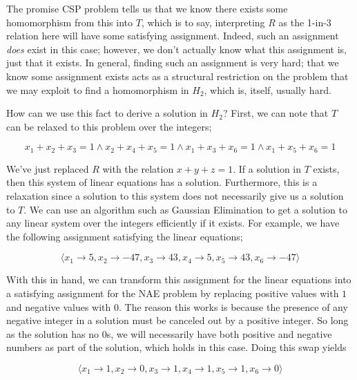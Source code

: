 The promise CSP problem tells us that we know there exists some homomorphism from this into $T$, which is to say, interpreting $R$ as the 1-in-3 relation here will have some satisfying assignment. Indeed, such an assignment \textit{does} exist in this case; however, we don't actually know what this assignment is, just that it exists. In general, finding such an assignment is very hard; that we know some assignment exists acts as a structural restriction on the problem that we may exploit to find a homomorphism in $H_2$, which is, itself, usually hard.

How can we use this fact to derive a solution in $H_2$? First, we can note that $T$ can be relaxed to this problem over the integers;

\begin{equation}
    x_1 + x_2 + x_3 = 1 \wedge x_2 + x_4 + x_5 = 1 \wedge x_1 + x_3 + x_6 = 1 \wedge x_1 + x_5 + x_6 = 1
\end{equation}

We've just replaced $R$ with the relation $x + y + z = 1$. If a solution in $T$ exists, then this system of linear equations has a solution. Furthermore, this is a relaxation since a solution to this system does not necessarily give us a solution to $T$. We can use an algorithm such as Gaussian Elimination to get a solution to any linear system over the integers efficiently if it exists. For example, we have the following assignment satisfying the linear equations;

\begin{equation}
    \langle x_1 \rightarrow 5, x_2 \rightarrow -47, x_3 \rightarrow 43, x_4 \rightarrow 5, x_5 \rightarrow 43, x_6 \rightarrow -47 \rangle
\end{equation}

With this in hand, we can transform this assignment for the linear equations into a satisfying assignment for the NAE problem by replacing positive values with $1$ and negative values with $0$. The reason this works is because the presence of any negative integer in a solution must be canceled out by a positive integer. So long as the solution has no 0s, we will necessarily have both positive and negative numbers as part of the solution, which holds in this case. Doing this swap yields

\begin{equation}
    \langle x_1 \rightarrow 1, x_2 \rightarrow 0, x_3 \rightarrow 1, x_4 \rightarrow 1, x_5 \rightarrow 1, x_6 \rightarrow 0 \rangle
\end{equation}

